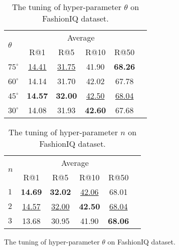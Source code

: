 \documentclass[letterpaper]{article} \usepackage{aaai24}  \usepackage{times}  \usepackage{helvet}  \usepackage{courier}  \usepackage[hyphens]{url}  \usepackage{graphicx} \urlstyle{rm} \def\UrlFont{\rm}  \usepackage{natbib}  \usepackage{caption} \frenchspacing  \setlength{\pdfpagewidth}{8.5in} \setlength{\pdfpageheight}{11in} \usepackage{amsmath,amsfonts}
\begin{document}
\begin{table}[]
    \centering
   \begin{tabular}{l|ccccc}
    \toprule
    \multirow{2}{*}{$\theta$} & \multicolumn{4}{c}{Average}\\
    \cmidrule{2-5}
    \multirow{2}{*}{} & R@1 & R@5 & R@10 & R@50\\
    \toprule
    $75^{\circ}$ & \underline{14.41} & \underline{31.75} & 41.90 & \textbf{68.26} \\
    $60^{\circ}$ & 14.14 & 31.70 & 42.02 & 67.78 \\
    $45^{\circ}$ & \textbf{14.57} & \textbf{32.00} & \underline{42.50} & \underline{68.04} \\
    $30^{\circ}$ & 14.08 & 31.93 & \textbf{42.60} & 67.68 \\
    \bottomrule
    \end{tabular}
    \caption{The tuning of hyper-parameter $\theta$ on FashionIQ dataset.}
    \label{tab:hyper-parameter theta}
\end{table}

\begin{table}[]
    \centering
     \begin{tabular}{l|ccccc}
    \toprule
    \multirow{2}{*}{$n$} & \multicolumn{4}{c}{Average}\\
    \cmidrule{2-5}
    \multirow{2}{*}{} & R@1 & R@5 & R@10 & R@50 \\
    \toprule
    $1$ & \textbf{14.69} & \textbf{32.02} & \underline{42.06} & 68.01 \\
    $2$ & \underline{14.57} & \underline{32.00} & \textbf{42.50} & \underline{68.04} \\
    $3$ & 13.68 & 30.95 & 41.90 & \textbf{68.06} \\
    \bottomrule
    \end{tabular}
    \caption{The tuning of hyper-parameter $n$ on FashionIQ dataset.}
    \label{tab:hyper-parameter n}
\end{table}

\iffalse
\begin{threeparttable}
    \centering
    \caption{The tuning of hyper-parameter $\theta$ on FashionIQ dataset.}
    \label{tab:hyper-parameter theta}
\end{threeparttable}
\end{document}
